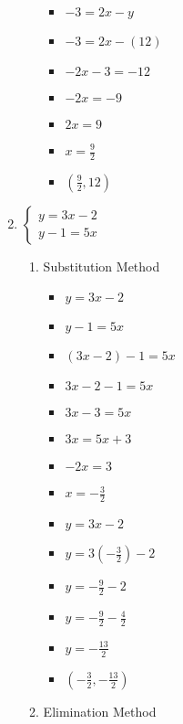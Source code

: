 \documentclass{article}
\begin{document}
\begin{enumerate}
\begin{enumerate}
\begin{itemize}
    \item $-3=2x-y$
    \item $-3=2x-(12)$
    \item $-2x-3=-12$
    \item $-2x=-9$
    \item $2x=9$
    \item {\Large $x=\frac{9}{2}$}
    \item {\Large $\left(\frac{9}{2},12\right)$}
    \end{itemize}
  \end{enumerate}
\item $\left\{ \begin{array}{l}
      y=3x-2 \\
      y-1=5x \end{array} \right.$
  \begin{enumerate}
  \item Substitution Method
    \begin{itemize}
    \item $y=3x-2$
    \item $y-1=5x$
    \item $(3x-2)-1=5x$
    \item $3x-2-1=5x$
    \item $3x-3=5x$
    \item $3x=5x+3$
    \item $-2x=3$
    \item {\Large $x=-\frac{3}{2}$}
    \item $y=3x-2$
    \item {\Large $y=3\left(-\frac{3}{2}\right)-2$}
    \item {\Large $y=-\frac{9}{2}-2$}
    \item {\Large $y=-\frac{9}{2}-\frac{4}{2}$}
    \item {\Large $y=-\frac{13}{2}$}
    \item {\Large $\left(-\frac{3}{2},-\frac{13}{2}\right)$}
    \end{itemize}
  \item Elimination Method
\end{enumerate}
\end{enumerate}
\end{document}
